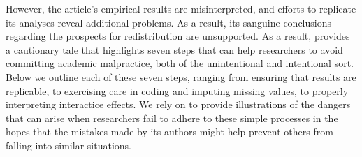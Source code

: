 However, the article's empirical results are misinterpreted, and efforts to replicate its analyses reveal additional problems.  As a result, its sanguine conclusions regarding the prospects for redistribution are unsupported. As a result, \citet{Newman2015} provides a cautionary tale that highlights seven steps that can help researchers to avoid committing academic malpractice, both of the unintentional and intentional sort. Below we outline each of these seven steps, ranging from ensuring that results are replicable, to exercising care in coding and imputing missing values, to properly interpreting interactice effects. We rely on \citet{Newman2015} to provide illustrations of the dangers that can arise when researchers fail to adhere to these simple processes in the hopes that the mistakes made by its authors might help prevent others from falling into similar situations.



